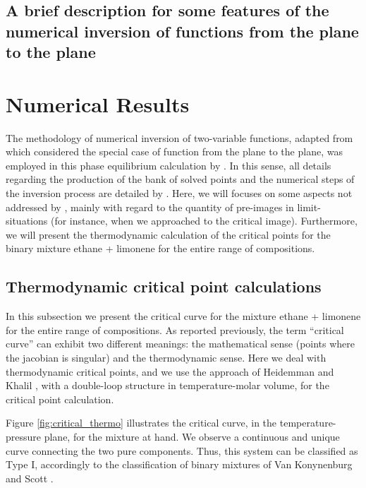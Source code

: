 \documentclass[journal=iecred,manuscript=article]{achemso}
\theoremstyle{definition}
\theoremstyle{remark}
\begin{document}
\subsection{A brief description for some features of the numerical inversion of functions from the plane to the plane}


\section{Numerical Results}

The methodology of numerical inversion of two-variable functions, adapted from \citet{malta} which considered the special case of function from the plane to the plane,
 was employed in this phase equilibrium calculation by \citet{ireme}. In this sense, all details regarding the production of the bank of solved points and the numerical steps of the inversion process are detailed by \citet{ireme}. Here, we will focuses on some aspects not addressed by \citet{ireme}, mainly with regard
 to the quantity of pre-images in  limit-situations (for instance, when we approached to the critical image). Furthermore, we will present the thermodynamic calculation of the critical points for the binary mixture ethane + limonene for the entire range of compositions.
 
\subsection{Thermodynamic critical point calculations}

In this subsection we present the critical curve for the mixture ethane + limonene for the entire range of compositions. As reported previously, the term ``critical curve'' can exhibit two different meanings: the mathematical sense (points where the jacobian is 
singular) and the thermodynamic sense. Here we deal
 with thermodynamic critical points, and we use the approach of Heidemman and Khalil \citep{heidemman}, with a double-loop structure in temperature-molar volume, for the critical point calculation.

Figure \ref{fig:critical_thermo} illustrates the critical curve, in the temperature-pressure plane, for the mixture at hand. We observe a continuous and unique curve connecting the two pure components. Thus, this system can be classified as Type I, accordingly to the classification of binary mixtures of Van Konynenburg and Scott \cite{classif}.
\end{document}
